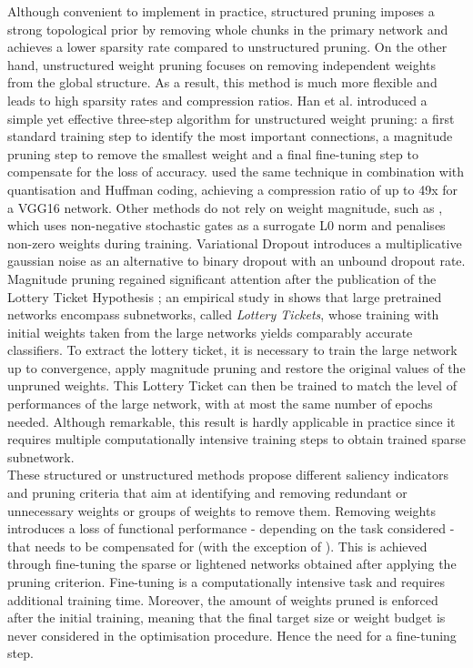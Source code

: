 Although convenient to implement in practice, structured pruning imposes a
strong topological prior by removing whole chunks in the primary network and
achieves a lower sparsity rate compared to unstructured pruning. On the other
hand, unstructured weight pruning focuses on removing independent weights from
the global structure. As a result, this method is much more flexible and leads
to high sparsity rates and compression ratios. Han et al.
\cite{DBLP:conf/nips/HanPTD15} introduced a simple yet effective three-step
algorithm for unstructured weight pruning: a first standard training step to
identify the most important connections, a magnitude pruning step to remove the
smallest weight and a final fine-tuning step to compensate for the loss of
accuracy. \cite{DBLP:journals/corr/HanMD15} used the same technique in
combination with quantisation and Huffman coding, achieving a compression ratio
of up to 49x for a VGG16 network. Other methods do not rely on weight magnitude,
such as \cite{DBLP:conf/iclr/LouizosWK18}, which uses non-negative stochastic
gates as a surrogate L0 norm and penalises non-zero weights during training.
Variational Dropout \cite{DBLP:conf/icml/MolchanovAV17} introduces a
multiplicative gaussian noise as an alternative to binary dropout
\cite{DBLP:journals/corr/abs-1207-0580,DBLP:journals/jmlr/SrivastavaHKSS14} with
an unbound dropout rate. Magnitude pruning regained significant attention after
the publication of the Lottery Ticket Hypothesis
\cite{DBLP:conf/iclr/FrankleC19}; an empirical study in
\cite{DBLP:conf/iclr/FrankleC19} shows that large pretrained networks
encompass subnetworks, called \textit{Lottery Tickets}, whose training with initial
weights taken from the large networks yields comparably accurate classifiers. To
extract the lottery ticket, it is necessary to train the large network up to
convergence, apply magnitude pruning and restore the original values of the
unpruned weights. This Lottery Ticket can then be trained to match the level of
performances of the large network, with at most the same number of epochs
needed. Although remarkable, this result is hardly applicable in practice since
it requires multiple computationally intensive training steps to obtain trained
sparse subnetwork.\\


These structured or unstructured methods propose different saliency indicators
and pruning criteria that aim at identifying and removing redundant or
unnecessary weights or groups of weights to remove them. Removing
weights introduces a loss of functional performance - depending on the task
considered - that needs to be compensated for (with the exception of
\cite{DBLP:conf/icml/KangH20}). This is achieved through fine-tuning the sparse
or lightened networks obtained after applying the pruning criterion. Fine-tuning
is a computationally intensive task and requires additional training time.
Moreover, the amount of weights pruned is enforced after the initial training,
meaning that the final target size or weight budget is never considered in the
optimisation procedure. Hence the need for a fine-tuning step. \\


